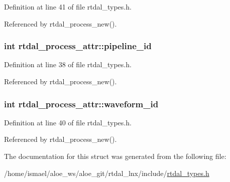 Definition at line 41 of file rtdal\-\_\-types.\-h.



Referenced by rtdal\-\_\-process\-\_\-new().

\hypertarget{structrtdal__process__attr_acd4d32580ab29e3b881bebe616b5e833}{
\subsubsection[{pipeline\-\_\-id}]{\setlength{\rightskip}{0pt plus 5cm}int rtdal\-\_\-process\-\_\-attr\-::pipeline\-\_\-id}}\label{structrtdal__process__attr_acd4d32580ab29e3b881bebe616b5e833}


Definition at line 38 of file rtdal\-\_\-types.\-h.



Referenced by rtdal\-\_\-process\-\_\-new().

\hypertarget{structrtdal__process__attr_a1c0bf46255fa36473470d432234e626f}{
\subsubsection[{waveform\-\_\-id}]{\setlength{\rightskip}{0pt plus 5cm}int rtdal\-\_\-process\-\_\-attr\-::waveform\-\_\-id}}\label{structrtdal__process__attr_a1c0bf46255fa36473470d432234e626f}


Definition at line 40 of file rtdal\-\_\-types.\-h.



Referenced by rtdal\-\_\-process\-\_\-new().



The documentation for this struct was generated from the following file\-:\begin{DoxyCompactItemize}
\item 
/home/ismael/aloe\-\_\-ws/aloe\-\_\-git/rtdal\-\_\-lnx/include/\hyperlink{rtdal__types_8h}{rtdal\-\_\-types.\-h}\end{DoxyCompactItemize}
